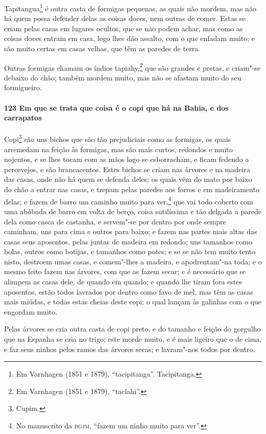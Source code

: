 \begin{linenumbers}
Tapitangua\footnote{ Em Varnhagen (1851 e 1879), ``tacipitanga''. Tacipitanga.} é outra
casta de formigas pequenas, as quais não mordem, mas não há quem possa defender delas as
coisas doces, nem outras de comer. Estas se criam pelas casas em lugares ocultos, que se
não podem achar, mas como as coisas doces entram em casa, logo lhes dão assalto, com o que
enfadam muito; e são muito certas em casas velhas, que têm as paredes de terra.

Outras formigas chamam os índios tapiahy,\footnote{ Em Varnhagen (1851 e 1879),
``tacîahi''.} que são grandes e pretas, e criam"-se debaixo do chão; também mordem muito,
mas não se afastam muito do seu formigueiro.

\paragraph{123 Em que se trata que coisa é o copi que há na Bahia, e dos carrapatos}\quad
Copi\footnote{ Cupim.} são uns bichos que são tão prejudiciais como as formigas, os quais
arremedam na feição às formigas, mas são mais curtos, redondos e muito nojentos, e se lhes
tocam com as mãos logo se esborracham, e ficam fedendo a percevejos, e são brancacentos.
Estes bichos se criam nas árvores e na madeira das casas, onde não há quem se defenda
deles; os quais vêm do mato por baixo do chão a entrar nas casas, e trepam pelas paredes
aos forros e em madeiramento delas; e fazem de barro um caminho muito para ver,\footnote{
No manuscrito da \textsc{bgjm}, ``fazem um ninho muito para ver''.} que vai todo coberto
com uma abóbada de barro em volta de berço, coisa sutilíssima e tão delgada a parede dela
como casca de castanha, e servem"-se por dentro por onde sempre caminham, uns para cima e
outros para baixo; e fazem nas partes mais altas das casas seus aposentos, pelas juntas de
madeira em redondo; uns tamanhos como bolas, outros como botijas, e tamanhos como potes; e
se se não tem muito tento nisto, destroem umas casas, e comem"-lhes a madeira, e
apodrentam"-na toda; e o mesmo feito fazem nas árvores, com que as fazem secar; e é
necessário que se alimpem as casas dele, de quando em quando; e quando lhe tiram fora
estes aposentos, estão todos lavrados por dentro como favo de mel, mas têm as casas mais
miúdas, e todas estas cheias deste copi; o qual lançam às galinhas com o que engordam
muito.

Pelas árvores se cria outra casta de copi preto, e do tamanho e feição do gorgulho que na
Espanha se cria no trigo; este morde muito, e é mais ligeiro que o de cima, e faz seus
ninhos pelos ramos das árvores secas; e lavram"-nos todos por dentro.


\end{linenumbers}
